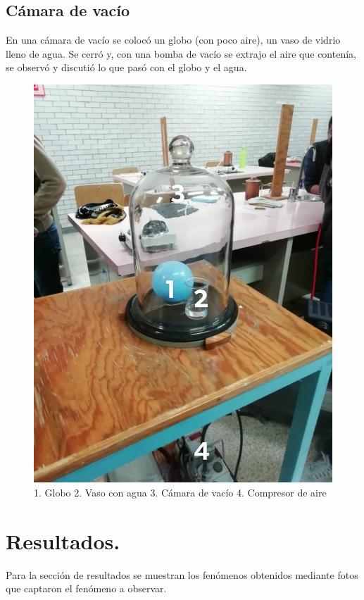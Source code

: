 \documentclass[10pt,a4paper]{article}
\begin{document}
\subsection*{Cámara de vacío} 
En una cámara de vacío se colocó un globo (con poco aire), un vaso de vidrio lleno de agua. Se cerró y, con una bomba de vacío se extrajo el aire que contenía, se observó y discutió lo que pasó con el globo y el agua. 
\begin{figure}[H]
\includegraphics[scale=0.18]{2.jpeg}
\centering
\caption{1. Globo 2. Vaso con agua 3. Cámara de vacío 4. Compresor de aire}
\end{figure}


\section{Resultados.}
Para la sección de resultados se muestran los fenómenos obtenidos mediante fotos que captaron el fenómeno a observar.
\end{document}
